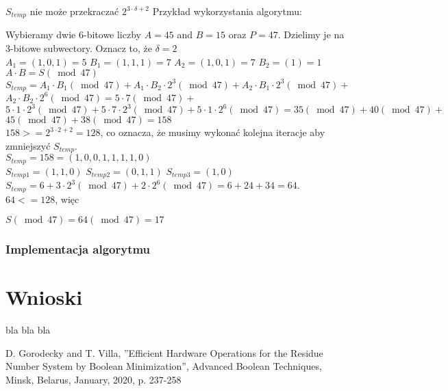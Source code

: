 \documentclass[11pt]{article}
\renewcommand\*{\cdot}
\begin{document}
$S_{temp}$ nie może przekraczać  $ 2^{3 \cdot \delta+2}$
\newpage
Przykład wykorzystania algorytmu:


Wybieramy dwie 6-bitowe liczby $A=45$ and $B=15$ oraz $P=47$. Dzielimy je na 3-bitowe subwectory. Oznacz to, że $\delta = 2$
\\
$A_1=\left(1, 0, 1\right) = 5$
$B_1=\left(1,1,1\right) = 7$
$A_2=\left(1, 0, 1\right) = 7$
$B_2=\left(1\right) = 1$
$A \cdot B=S(\bmod 47)$\\

$S_{temp} = A_1 \cdot B_1(\bmod 47)+A_1 \cdot B_2 \cdot 2^3(\bmod 47)+A_2 \cdot B_1 \cdot 2^3(\bmod 47)+$ $A_2 \cdot B_2 \cdot 2^6(\bmod 47) =5 \cdot 7(\bmod 47)+$ $5 \cdot 1 \cdot 2^3(\bmod 47)+5 \cdot 7 \cdot 2^3(\bmod 47)+5 \cdot 1 \cdot 2^6(\bmod 47)=35(\bmod 47)+40(\bmod 47)+$ $45(\bmod 47)+38(\bmod 47)=158$
\\


$158 >= 2^{3 \cdot 2+2} = 128$, co oznacza, że musimy wykonać kolejna iteracje aby zmniejszyć $S_{temp}$.
\\


$S_{temp} = 158 = \left(1,0,0,1,1,1,1,0\right)$
\\

$S_{temp1} = \left(1,1,0 \right)$
$S_{temp2} = \left(0,1,1 \right)$
$S_{temp3} = \left(1,0 \right)$
\\

$S_{temp} =6+3 \cdot 2^3(\bmod 47)+2 \cdot 2^6(\bmod 47)=6+24+34=64$.
\\

$64 <=  128$, więc

$S(\bmod 47) = 64(\bmod 47) = 17$


\subsubsection{Implementacja algorytmu}


\section{Wnioski}
bla bla bla
\begin{thebibliography}{9}
    D. Gorodecky and T. Villa, ”Efficient Hardware Operations for the Residue Number
    System by Boolean Minimization”, Advanced Boolean Techniques, Minsk, Belarus,
    January, 2020, p. 237-258
\end{thebibliography}
\end{document}

